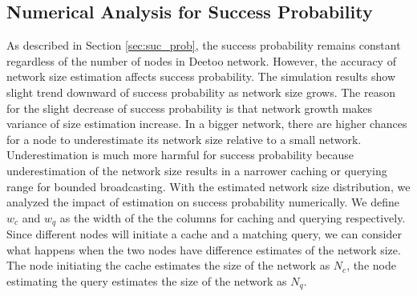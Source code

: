 \documentclass[9.5pt,journal,final,finalsubmission,twocolumn]{IEEEtran}
\begin{document}


\subsection{Numerical Analysis for Success Probability}
As described in Section \ref{sec:suc_prob}, the success probability remains constant 
regardless of the number of nodes in Deetoo network. However, 
the accuracy of network size estimation affects success probability.
The simulation results show slight trend downward of success probability as network size grows. 
The reason for the slight decrease of success probability is that network 
growth makes variance of size estimation increase. In a bigger network, there are higher 
chances for a node to underestimate its network size relative to a small network. 
Underestimation is much more harmful for success probability because underestimation 
of the network size results in a narrower caching or querying range for bounded broadcasting. 
With the estimated network size distribution, 
we analyzed the impact of estimation on success probability numerically.  
We define $w_c$ and $w_q$ as the width of the the columns for caching and
querying respectively.  Since different nodes will initiate a cache and a
matching query, we can consider what happens when the two nodes have
difference estimates of the network size.  The node initiating the
cache estimates the size of the network as $N_c$, the node estimating
the query estimates the size of the network as $N_q$.
\end{document}
